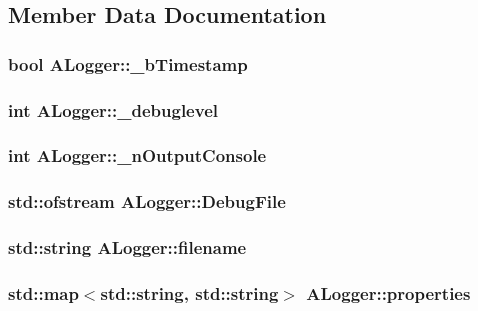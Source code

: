 \subsection{Member Data Documentation}
\hypertarget{classALogger_a08e8858325f740fd3b6c27bb5f794e63}{
\subsubsection[{\-\_\-b\-Timestamp}]{\setlength{\rightskip}{0pt plus 5cm}bool A\-Logger\-::\-\_\-b\-Timestamp}}\label{classALogger_a08e8858325f740fd3b6c27bb5f794e63}
\hypertarget{classALogger_a680c94f43da91fdd9644cdcd3ed62f46}{
\subsubsection[{\-\_\-debuglevel}]{\setlength{\rightskip}{0pt plus 5cm}int A\-Logger\-::\-\_\-debuglevel}}\label{classALogger_a680c94f43da91fdd9644cdcd3ed62f46}
\hypertarget{classALogger_a0b227d33030ccce4b5a0cbad3ce2aa9e}{
\subsubsection[{\-\_\-n\-Output\-Console}]{\setlength{\rightskip}{0pt plus 5cm}int A\-Logger\-::\-\_\-n\-Output\-Console}}\label{classALogger_a0b227d33030ccce4b5a0cbad3ce2aa9e}
\hypertarget{classALogger_ac794719a08e041b2adf5cad4449ba08e}{
\subsubsection[{Debug\-File}]{\setlength{\rightskip}{0pt plus 5cm}std\-::ofstream A\-Logger\-::\-Debug\-File}}\label{classALogger_ac794719a08e041b2adf5cad4449ba08e}
\hypertarget{classALogger_a963caefa4b53d7fc416744c0150257af}{
\subsubsection[{filename}]{\setlength{\rightskip}{0pt plus 5cm}std\-::string A\-Logger\-::filename}}\label{classALogger_a963caefa4b53d7fc416744c0150257af}
\hypertarget{classALogger_a92c40eee23bd69472b83955a4367d2f5}{
\subsubsection[{properties}]{\setlength{\rightskip}{0pt plus 5cm}std\-::map$<$std\-::string, std\-::string$>$ A\-Logger\-::properties}}\label{classALogger_a92c40eee23bd69472b83955a4367d2f5}


